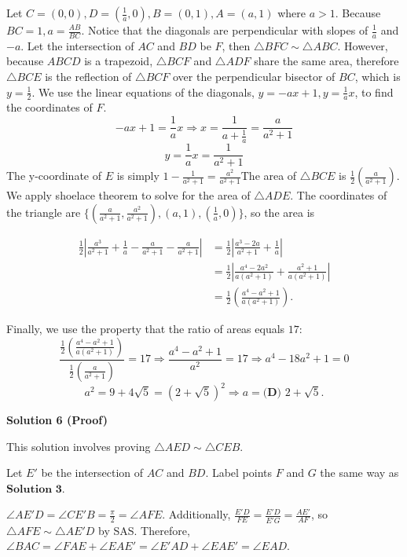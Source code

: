 \begin{enumerate}
Let $C = (0,0), D=\left(\frac1a, 0\right), B = (0,1), A = (a,1)$ where $a>1$. Because $BC = 1, a = \frac{AB}{BC}$. Notice that the diagonals are perpendicular with slopes of $\frac1a$ and $-a$. Let the intersection of $AC$ and $BD$ be $F$, then $\triangle BFC \sim \triangle ABC$. However, because $ABCD$ is a trapezoid, $\triangle$$BCF$ and $\triangle ADF$ share the same area, therefore $\triangle$$BCE$ is the reflection of $\triangle$$BCF$ over the perpendicular bisector of $BC$, which is $y=\frac12$. We use the linear equations of the diagonals, $y = -ax + 1, y = \frac1a x$, to find the coordinates of $F$. 
 \[-ax+1 = \frac1ax \Longrightarrow x = \frac{1}{a+\frac1a} = \frac{a}{a^2+1}\] 
 \[y = \frac1ax = \frac{1}{a^2+1}\]The y-coordinate of $E$ is simply $1-\frac{1}{a^2+1} = \frac{a^2}{a^2+1}$The area of $\triangle BCE$ is $\frac12 \left(\frac{a}{a^2+1} \right)$. We apply shoelace theorem to solve for the area of $\triangle ADE$. The coordinates of the triangle are $\{(\frac{a}{a^2+1}, \frac{a^2}{a^2+1}), (a,1), (\frac1a, 0)\}$, so the area is 

 \begin{equation}\begin{split}\frac12 \left|\frac{a^3}{a^2+1} + \frac1a - \frac{a}{a^2+1} - \frac{a}{a^2+1}\right| & = \frac12 \left|\frac{a^3-2a}{a^2+1} + \frac1a \right| \\& = \frac12 \left|\frac{a^4-2a^2}{a(a^2+1)} + \frac{a^2+1}{a(a^2+1)} \right| \\& = \frac12 \left( \frac{a^4-a^2+1}{a(a^2+1)}\right).\end{split}\end{equation}

 Finally, we use the property that the ratio of areas equals $17$:
 \[\frac{\frac12\left(\frac{a^4-a^2+1}{a(a^2+1)}\right)}{\frac12\left(\frac{a}{a^2+1}\right)} = 17 \Rightarrow \frac{a^4-a^2+1}{a^2} = 17 \Rightarrow a^4-18a^2+1 = 0\]
 \[a^2 = 9+4\sqrt{5} = (2+\sqrt{5})^2 \Longrightarrow a = \boxed{\textbf{(D) } 2+\sqrt{5}}.\]




\textbf{Solution 6 (Proof)}

This solution involves proving $\triangle AED \sim \triangle CEB$.

 Let $E'$ be the intersection of $AC$ and $BD$. Label points $F$ and $G$ the same way as $\textbf{Solution 3}$.

 
$\angle AE'D = \angle CE'B = \frac{\pi}{2} = \angle AFE$. Additionally, $\frac{E'D}{FE} = \frac{E'D}{E'G} = \frac{AE'}{AF}$, so $\triangle AFE \sim \triangle AE'D$ by SAS. Therefore, $\angle BAC = \angle FAE + \angle EAE' = \angle E'AD + \angle EAE' = \angle EAD$.


\end{enumerate}
